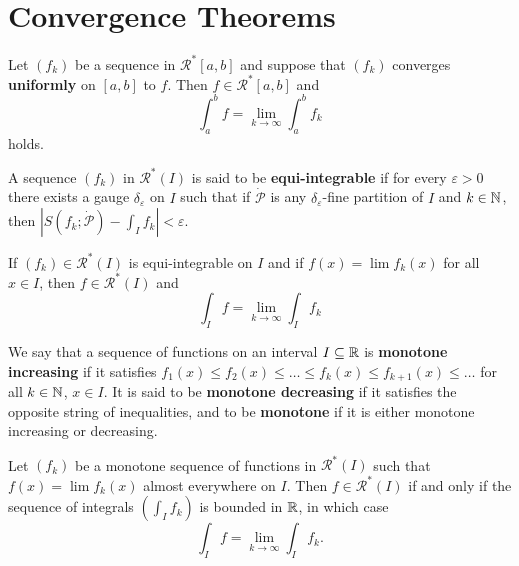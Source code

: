 \section{Convergence Theorems}

\begin{theorem}
	Let $(f_k)$ be a sequence in $\mathcal{R}^*[a,b]$ and suppose that $(f_k)$ converges \textbf{uniformly} on $[a,b]$ to $f$. Then $f \in \mathcal{R}^*[a,b]$ and
	\[\displaystyle\int_{a}^{b}f=\lim\limits_{k \to \infty}\displaystyle\int_{a}^{b}f_k\]
	holds.
\end{theorem}

\begin{definition}
	A sequence $(f_k)$ in $\mathcal{R}^*(I)$ is said to be \textbf{equi-integrable} if for every $\varepsilon>0$ there exists a gauge $\delta_\varepsilon$ on $I$ such that if $\dot{\mathcal{P}}$ is any $\delta_\varepsilon$-fine partition of $I$ and $k\in\mathbb{N}$, then $\left|S(f_k;\dot{\mathcal{P}})-\displaystyle\int_If_k\right|<\varepsilon$.
\end{definition}

\begin{theorem}
	If $(f_k) \in \mathcal{R}^*(I)$ is equi-integrable on $I$ and if $f(x)=\lim f_k(x)$ for all $x \in I$, then $f \in \mathcal{R}^*(I)$ and
	\[\displaystyle\int_If=\lim\limits_{k \to \infty}\displaystyle\int_If_k\]
\end{theorem}

\begin{definition}
	We say that a sequence of functions on an interval $I \subseteq \mathbb{R}$ is \textbf{monotone increasing} if it satisfies $f_1(x) \leq f_2(x) \leq \dots \leq f_k(x) \leq f_{k+1}(x) \leq \dots$ for all $k \in \mathbb{N}$, $x \in I$. It is said to be \textbf{monotone decreasing} if it satisfies the opposite string of inequalities, and to be \textbf{monotone} if it is either monotone increasing or decreasing.
\end{definition}

\begin{theorem}
	Let $(f_k)$ be a monotone sequence of functions in $\mathcal{R}^*(I)$ such that $f(x)=\lim f_k(x)$ almost everywhere on $I$. Then $f \in \mathcal{R}^*(I)$ if and only if the sequence of integrals $\left(\int_I f_k\right)$ is bounded in $\mathbb{R}$, in which case
	\[\int_I f = \lim\limits_{k \to \infty} \int_I f_k.\]
\end{theorem}

